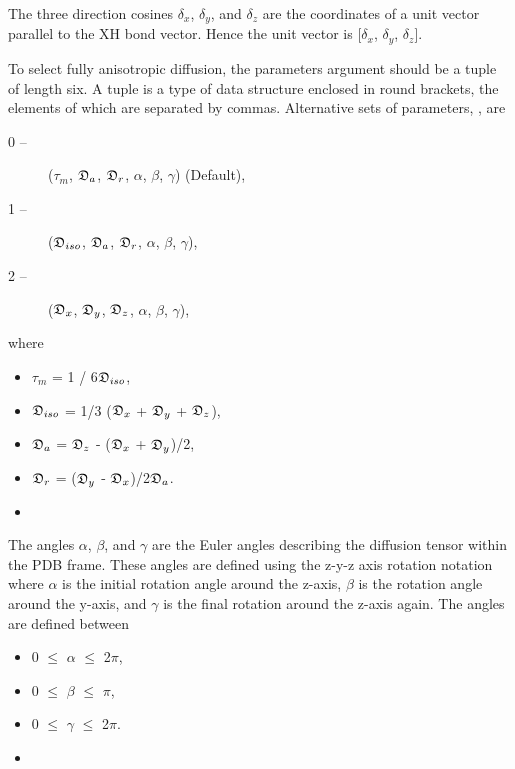  The three direction cosines $\delta_x$, $\delta_y$, and $\delta_z$ are the coordinates of a unit vector parallel to the XH bond vector.  Hence the unit vector is [$\delta_x$, $\delta_y$, $\delta_z$]. 
  

 To select fully anisotropic diffusion, the parameters argument should be a tuple of length six.  A tuple is a type of data structure enclosed in round brackets, the elements of which are separated by commas.  Alternative sets of parameters, , are 
  

 \begin{description} 
 \item[0 --]  ($\tau_m$, $\mathfrak{D}_a$, $\mathfrak{D}_r$, $\alpha$, $\beta$, $\gamma$)   (Default),  
 \item[1 --]  ($\mathfrak{D}_{iso}$, $\mathfrak{D}_a$, $\mathfrak{D}_r$, $\alpha$, $\beta$, $\gamma$),  
 \item[2 --]  ($\mathfrak{D}_x$, $\mathfrak{D}_y$, $\mathfrak{D}_z$, $\alpha$, $\beta$, $\gamma$),  
 \end{description} 
  

 where 
  

 \begin{itemize} 
 \item[] $\tau_m$ = 1 / 6$\mathfrak{D}_{iso}$,  
 \item[] $\mathfrak{D}_{iso}$ = 1/3 ($\mathfrak{D}_x$ + $\mathfrak{D}_y$ + $\mathfrak{D}_z$),  
 \item[] $\mathfrak{D}_a$ = $\mathfrak{D}_z$ - ($\mathfrak{D}_x$ + $\mathfrak{D}_y$)/2,  
 \item[] $\mathfrak{D}_r$ = ($\mathfrak{D}_y$ - $\mathfrak{D}_x$)/2$\mathfrak{D}_a$.  
 \item[]  
 \end{itemize} 
  

 The angles $\alpha$, $\beta$, and $\gamma$ are the Euler angles describing the diffusion tensor within the PDB frame.  These angles are defined using the z-y-z axis rotation notation where $\alpha$ is the initial rotation angle around the z-axis, $\beta$ is the rotation angle around the y-axis, and $\gamma$ is the final rotation around the z-axis again.  The angles are defined between 
  

 \begin{itemize} 
 \item[] 0 $\le$ $\alpha$ $\le$ 2$\pi$,  
 \item[] 0 $\le$ $\beta$ $\le$ $\pi$,  
 \item[] 0 $\le$ $\gamma$ $\le$ 2$\pi$.  
 \item[]  
 \end{itemize} 
  

